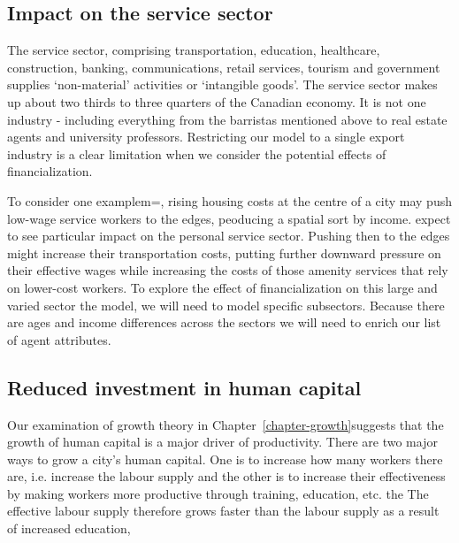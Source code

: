 \subsection{Impact on the service sector}
The service sector, comprising transportation, education, healthcare, construction, banking, communications, retail services, tourism and government  supplies `non-material' activities or `intangible goods'. The service sector makes up about two thirds to three quarters  of the Canadian economy. It is not one industry - including everything from the barristas mentioned above to real estate agents and university professors. Restricting our model to a single export industry is a clear limitation when we consider the potential effects of financialization.

To consider one examplem=, rising housing costs at the centre of a city may push low-wage service workers to the edges, peoducing a spatial sort by income. expect to see particular impact on the personal service sector. Pushing then to the edges  might increase their transportation costs, putting further downward pressure on their effective wages while increasing the costs of those amenity services that rely on lower-cost workers. 
To explore the effect of financialization on this large and varied sector the model, we will need to  model specific subsectors. Because there are ages and income differences across the sectors we will need to enrich our list of agent attributes. 





\subsection{Reduced investment in human capital}

Our examination of growth theory in Chapter~\ref{chapter-growth}suggests that the growth of human capital is  a major driver of productivity. There are two major ways to grow a city's human capital. One is to increase how many workers there are, i.e. increase the labour supply and the other is to increase their effectiveness by making workers more productive through training, education, etc. the The effective labour supply therefore grows faster than the labour supply as a result of increased education,

